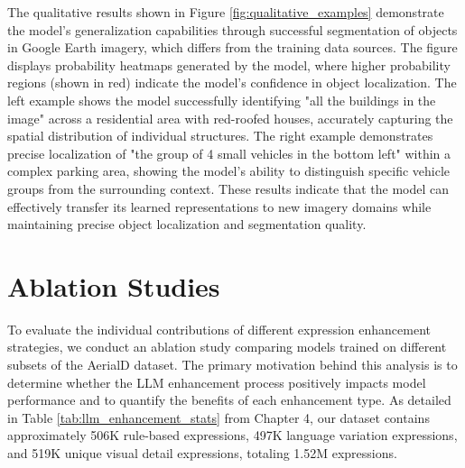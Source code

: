 The qualitative results shown in Figure \ref{fig:qualitative_examples} demonstrate the model's generalization capabilities through successful segmentation of objects in Google Earth imagery, which differs from the training data sources. The figure displays probability heatmaps generated by the model, where higher probability regions (shown in red) indicate the model's confidence in object localization. The left example shows the model successfully identifying "all the buildings in the image" across a residential area with red-roofed houses, accurately capturing the spatial distribution of individual structures. The right example demonstrates precise localization of "the group of 4 small vehicles in the bottom left" within a complex parking area, showing the model's ability to distinguish specific vehicle groups from the surrounding context. These results indicate that the model can effectively transfer its learned representations to new imagery domains while maintaining precise object localization and segmentation quality.

\section{Ablation Studies}

To evaluate the individual contributions of different expression enhancement strategies, we conduct an ablation study comparing models trained on different subsets of the AerialD dataset. The primary motivation behind this analysis is to determine whether the LLM enhancement process positively impacts model performance and to quantify the benefits of each enhancement type. As detailed in Table \ref{tab:llm_enhancement_stats} from Chapter 4, our dataset contains approximately 506K rule-based expressions, 497K language variation expressions, and 519K unique visual detail expressions, totaling 1.52M expressions.

